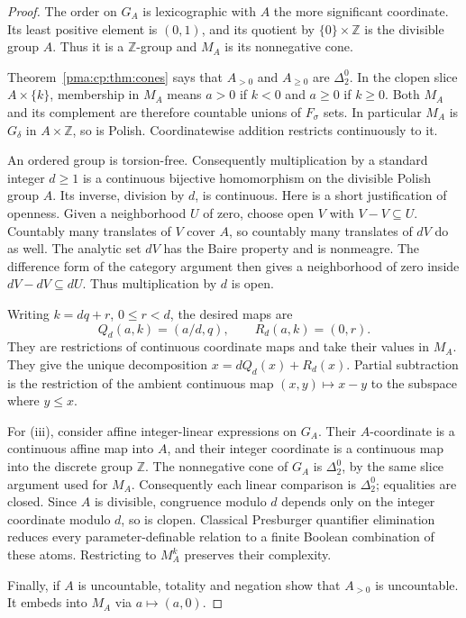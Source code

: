 \documentclass[11pt]{article}
\numberwithin{equation}{section}
\theoremstyle{definition}
\theoremstyle{remark}
\newcommand{\Z}{\mathbb Z}
\begin{document}
\begin{proof}
The order on $G_A$ is lexicographic with $A$ the more significant
coordinate. Its least positive element is $(0,1)$, and its quotient by
$\{0\}\times\Z$ is the divisible group $A$. Thus it is a $\Z$-group
and $M_A$ is its nonnegative cone.

Theorem~\ref{pma:cp:thm:cones} says that $A_{>0}$ and $A_{\geq0}$ are
$\Delta^0_2$. In the clopen slice $A\times\{k\}$, membership in $M_A$
means $a>0$ if $k<0$ and $a\geq0$ if $k\geq0$. Both $M_A$ and its
complement are therefore countable unions of $F_\sigma$ sets. In
particular $M_A$ is $G_\delta$ in $A\times\Z$, so is Polish.
Coordinatewise addition restricts continuously to it.

An ordered group is torsion-free. Consequently multiplication by a standard
integer $d\geq1$ is a continuous bijective homomorphism on the divisible
Polish group $A$. Its inverse, division by $d$, is continuous. Here is a
short justification of openness. Given a neighborhood $U$ of zero, choose
open $V$ with $V-V\subseteq U$. Countably many translates of $V$ cover
$A$, so countably many translates of $dV$ do as well. The analytic set
$dV$ has the Baire property and is nonmeagre. The difference form of the
category argument then gives a neighborhood of zero inside
$dV-dV\subseteq dU$. Thus multiplication by $d$ is open.

Writing $k=dq+r$, $0\leq r<d$, the desired maps are
\begin{equation}
\label{pma:cp:eq:generaldivision}
Q_d(a,k)=(a/d,q),\qquad R_d(a,k)=(0,r).
\end{equation}
They are restrictions of continuous coordinate maps and take their values
in $M_A$. They give the unique decomposition $x=dQ_d(x)+R_d(x)$.
Partial subtraction is the restriction of the ambient continuous map
$(x,y)\mapsto x-y$ to the subspace where $y\leq x$.

For (iii), consider affine integer-linear expressions on $G_A$. Their
$A$-coordinate is a continuous affine map into $A$, and their
integer coordinate is a continuous map into the discrete group $\Z$.
The nonnegative cone of $G_A$ is $\Delta^0_2$, by the same slice
argument used for $M_A$. Consequently each linear comparison is
$\Delta^0_2$; equalities are closed. Since $A$ is divisible, congruence
modulo $d$ depends only on the integer coordinate modulo $d$, so is
clopen. Classical Presburger quantifier elimination reduces every
parameter-definable relation to a finite Boolean combination of these
atoms. Restricting to $M_A^k$ preserves their complexity.

Finally, if $A$ is uncountable, totality and negation show that $A_{>0}$
is uncountable. It embeds into $M_A$ via $a\mapsto(a,0)$.
\end{proof}
\end{document}
